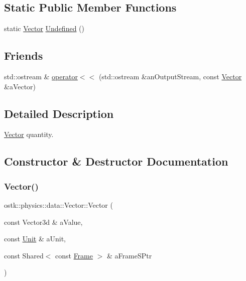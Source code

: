 \subsection*{Static Public Member Functions}
\begin{DoxyCompactItemize}
\item 
static \hyperlink{classostk_1_1physics_1_1data_1_1_vector}{Vector} \hyperlink{classostk_1_1physics_1_1data_1_1_vector_afb204c378708fdd162844a348da32db7}{Undefined} ()
\end{DoxyCompactItemize}
\subsection*{Friends}
\begin{DoxyCompactItemize}
\item 
std\+::ostream \& \hyperlink{classostk_1_1physics_1_1data_1_1_vector_a2f1253dbad20965d2209456421eabf71}{operator$<$$<$} (std\+::ostream \&an\+Output\+Stream, const \hyperlink{classostk_1_1physics_1_1data_1_1_vector}{Vector} \&a\+Vector)
\end{DoxyCompactItemize}


\subsection{Detailed Description}
\hyperlink{classostk_1_1physics_1_1data_1_1_vector}{Vector} quantity. 

\subsection{Constructor \& Destructor Documentation}
\mbox{\label{classostk_1_1physics_1_1data_1_1_vector_a513244719d0a6b4a37537ed5c9bb2c27}} 
\subsubsection{\texorpdfstring{Vector()}{Vector()}}
{\footnotesize\ttfamily ostk\+::physics\+::data\+::\+Vector\+::\+Vector (\begin{DoxyParamCaption}\item[{const Vector3d \&}]{a\+Value,  }\item[{const \hyperlink{classostk_1_1physics_1_1_unit}{Unit} \&}]{a\+Unit,  }\item[{const Shared$<$ const \hyperlink{classostk_1_1physics_1_1coord_1_1_frame}{Frame} $>$ \&}]{a\+Frame\+S\+Ptr }\end{DoxyParamCaption})}



